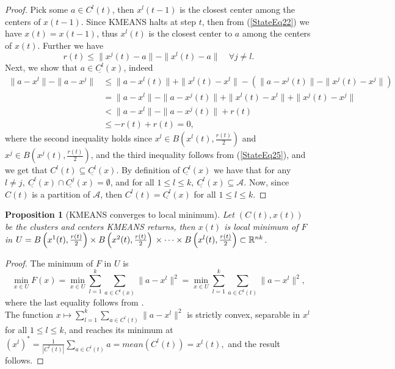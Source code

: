 \documentclass[11pt]{article}
\numberwithin{equation}{section}
\newtheorem{proposition}{Proposition}[section]
\begin{document}
\begin{proof}
Pick some $a \in C^l(t)$, then $x^l(t-1)$ is the closest center among the centers of $x(t-1)$. Since KMEANS halts at step $t$, then from (\ref{StateEq22}) we have $x(t)=x(t-1)$, thus $x^l(t)$ is the closest center to $a$ among the centers of $x(t)$. Further we have
\begin{equation}
	r(t) \leq \|x^j(t) - a\| - \|x^l(t) -a\| \quad \forall j \neq l . \label{StateEq25}
\end{equation}
Next, we show that $a \in \underline{C^l}(x)$, indeed
\begin{equation*}
\begin{aligned}
	\|a - x^l\| -  \|a - x^j\| &\leq \|a - x^l(t)\| + \|x^l(t) - x^l\| - \left( \|a - x^j(t)\| - \|x^j(t) - x^j\| \right) \\
	& = \|a - x^l\| - \|a - x^j(t)\| + \|x^l(t) - x^l\| + \|x^j(t) - x^j\| \\
	& < \|a - x^l\| - \|a - x^j(t)\| + r(t) \\
	& \leq -r(t) + r(t) = 0 ,
\end{aligned}
\end{equation*}
where the second inequality holds since $x^l \in B\left( x^l(t), \frac{r(t)}{2} \right)$ and $x^j \in B\left( x^j(t), \frac{r(t)}{2} \right)$, and the third inequality follows from (\ref{StateEq25}), and we get that $C^l(t) \subseteq \underline{C^l}(x)$. 
By definition of $\underline{C^l}(x)$ we have that for any $l \neq j, \: \underline{C^l}(x) \cap \underline{C^j}(x)=\emptyset$, and for all $1 \leq l \leq k, \: \underline{C^l}(x) \subseteq \mathcal{A}$. Now, since $C(t)$ is a partition of $\mathcal{A}$, then $C^l(t) = \underline{C^l}(x)$ for all $1 \leq l \leq k$.
\end{proof}

\begin{proposition}[KMEANS converges to local minimum]
Let $(C(t), x(t))$ be the clusters and centers KMEANS returns, then $x(t)$ is local minimum of $F$ in $U = B\left( x^1(t),\frac{r(t)}{2}\right) \times  B\left( x^2(t),\frac{r(t)}{2}\right) \\ \times \cdots \times B\left( x^l(t),\frac{r(t)}{2} \right) \subset \mathbb{R}^{nk}$.
\end{proposition}

\begin{proof}
The minimum of $F$ in $U$ is
\begin{equation*}
\min\limits_{x \in U} F(x) = \min\limits_{x \in U} \sum\limits_{l=1}^{k} \sum\limits_{a \in C^l(x)} \|a - x^l \|^2 = \min\limits_{x \in U} \sum\limits_{l=1}^{k} \sum\limits_{a \in C^l(t)} \|a - x^l \|^2 ,
\end{equation*}
where the last equality follows from .\\
The function $x \mapsto \sum\limits_{l=1}^{k} \sum\limits_{a \in C^l(t)} \|a - x^l \|^2$ is strictly convex, separable in $x^l$ for all $1 \leq l \leq k$, and reaches its minimum at $\left( x^l \right)^{*} = \frac{1}{\left| C^l(t) \right|} \sum\limits_{a \in C^l(t)} a = mean(C^l(t)) = x^l(t),$ and the result follows.
\end{proof}
\end{document}
